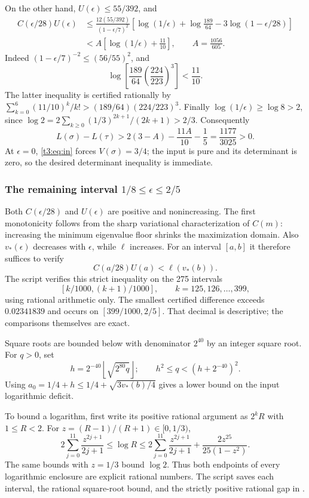 \documentclass[11pt,a4paper]{article}
\begin{document}
On the other hand, $U(\epsilon)\le55/392$, and
\begin{align*}
 C(\epsilon/28)U(\epsilon)
 &\le\frac{12(55/392)}{(1-\epsilon/7)^2}
 \left[\log(1/\epsilon)+\log\frac{189}{64}
                         -3\log(1-\epsilon/28)\right]\\
 &< A\left[\log(1/\epsilon)+\frac{11}{10}\right],
       \qquad A=\frac{1056}{605}.
\end{align*}
Indeed $(1-\epsilon/7)^{-2}\le(56/55)^2$, and
\[
 \log\!\left[\frac{189}{64}\left(\frac{224}{223}\right)^3\right]
 <\frac{11}{10}.
\]
The latter inequality is certified rationally by
$\sum_{k=0}^6(11/10)^k/k!>
 (189/64)(224/223)^3$.
Finally $\log(1/\epsilon)\ge\log8>2$, since
$\log2=2\sum_{k\ge0}(1/3)^{2k+1}/(2k+1)>2/3$.
Consequently
\[
 L(\sigma)-L(\tau)
 >2(3-A)-\frac{11A}{10}-\frac15
 =\frac{1177}{3025}>0.
\]
At $\epsilon=0$, \eqref{t3:eq:in} forces $V(\sigma)=3/4$;
the input is pure and its determinant is zero, so the desired
determinant inequality is immediate.

\subsubsection{The remaining interval $1/8\le\epsilon\le2/5$}
Both $C(\epsilon/28)$ and $U(\epsilon)$ are positive and
nonincreasing. The first monotonicity follows from the sharp
variational characterization of $C(m)$: increasing the minimum
eigenvalue floor shrinks the maximization domain.
Also $v_*(\epsilon)$ decreases with $\epsilon$, while $\ell$ increases.
For an interval $[a,b]$ it therefore suffices to verify
\[
 C(a/28)U(a)<\ell(v_*(b)).
\]
The script  verifies this strict
inequality on the 275 intervals
\[
 [k/1000,(k+1)/1000],\qquad k=125,126,\ldots,399,
\]
using rational arithmetic only. The smallest certified difference
exceeds $0.02341839$ and occurs on $[399/1000,2/5]$.
That decimal is descriptive; the comparisons themselves are exact.

Square roots are bounded below with denominator $2^{40}$ by an
integer square root. For $q>0$, set
\[
 h=2^{-40}\left\lfloor\sqrt{2^{80}q}\right\rfloor;
 \qquad h^2\le q<(h+2^{-40})^2.
\]
Using $a_0=1/4+h\le1/4+\sqrt{3v_*(b)/4}$ gives a lower bound
on the input logarithmic deficit.

To bound a logarithm, first write its positive rational argument as
$2^kR$ with $1\le R<2$. For $z=(R-1)/(R+1)\in[0,1/3)$,
\[
 2\sum_{j=0}^{11}\frac{z^{2j+1}}{2j+1}
 \le\log R\le
 2\sum_{j=0}^{11}\frac{z^{2j+1}}{2j+1}
   +\frac{2z^{25}}{25(1-z^2)}.
\]
The same bounds with $z=1/3$ bound $\log2$. Thus both endpoints
of every logarithmic enclosure are explicit rational numbers.
The script saves each interval, the rational square-root bound,
and the strictly positive rational gap in
.
\end{document}
